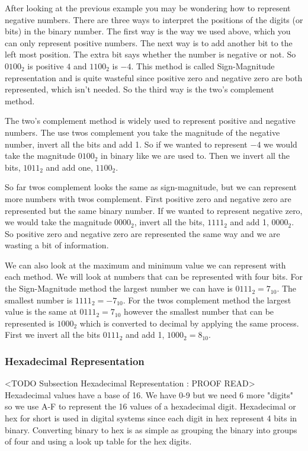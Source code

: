 After looking at the previous example you may be wondering how to represent negative numbers. There are three ways to interpret the positions of the digits (or bits) in the binary number. The first way is the way we used above, which you can only represent positive numbers. The next way is to add another bit to the left most position. The extra bit says whether the number is negative or not. So $0100_2$ is positive $4$ and $1100_2$ is $-4$. This method is called Sign-Magnitude representation and is quite wasteful since positive zero and negative zero are both represented, which isn't needed. So the third way is the two's complement method.	
	
The two's complement method is widely used to represent positive and negative numbers. The use twos complement you take the magnitude of the negative number, invert all the bits and add 1. So if we wanted to represent $-4$ we would take the magnitude $0100_2$ in binary like we are used to. Then we invert all the bits, $1011_2$ and add one, $1100_2$.	
	
So far twos complement looks the same as sign-magnitude, but we can represent more numbers with twos complement. First positive zero and negative zero are represented but the same binary number. If we wanted to represent negative zero, we would take the magnitude $0000_2$, invert all the bits, $1111_2$ and add 1, $0000_2$. So positive zero and negative zero are represented the same way and we are wasting a bit of information.
	
We can also look at the maximum and minimum value we can represent with each method. We will look at numbers that can be represented with four bits. For the Sign-Magnitude method the largest number we can have is $0111_2 = 7_{10}$. The smallest number is $1111_2 = -7_{10}$. For the twos complement method the largest value is the same at $0111_2 = 7_{10}$ however the smallest number that can be represented is $1000_2$ which is converted to decimal by applying the same process. First we invert all the bits $0111_2$ and add 1, $1000_2 = 8_{10}$.
	
\subsubsection{Hexadecimal Representation}
	<TODO Subsection Hexadecimal Representation : PROOF READ>
Hexadecimal values have a base of 16. We have 0-9 but we need 6 more "digits" so we use A-F to represent the 16 values of a hexadecimal digit. Hexadecimal or hex for short is used in digital systems since each digit in hex represent 4 bits in binary. Converting binary to hex is as simple as grouping the binary into groups of four and using a look up table for the hex digits.
	
